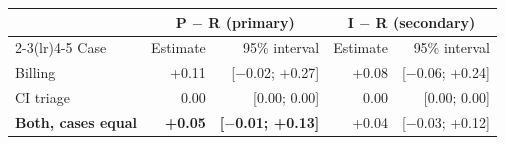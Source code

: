 \begin{tabular}{lrrrr}
\toprule
 & \multicolumn{2}{c}{P $-$ R (primary)} & \multicolumn{2}{c}{I $-$ R (secondary)} \\
\cmidrule(lr){2-3}\cmidrule(lr){4-5}
Case & Estimate & 95\% interval & Estimate & 95\% interval \\
\midrule
Billing & +0.11 & [$-$0.02; +0.27] & +0.08 & [$-$0.06; +0.24] \\
CI triage & 0.00 & [0.00; 0.00] & 0.00 & [0.00; 0.00] \\
\textbf{Both, cases equal} & \textbf{+0.05} & \textbf{[$-$0.01; +0.13]} & +0.04 & [$-$0.03; +0.12] \\
\bottomrule
\end{tabular}
